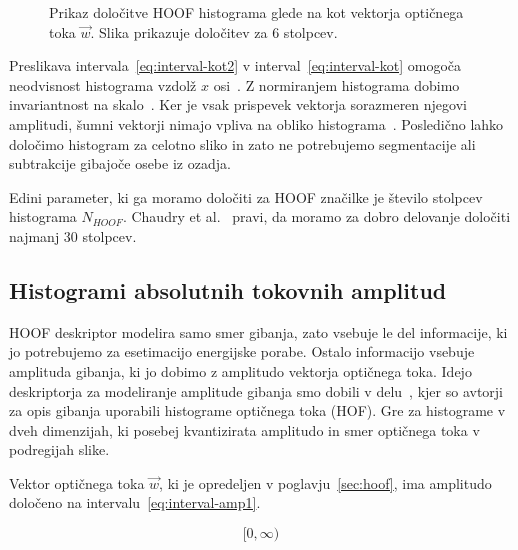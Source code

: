 \begin{figure}[htb]
\centering
\resizebox{0.5\columnwidth}{!}{}
\caption[Prikaz določitve HOOF histograma glede na kot vektorja]{Prikaz določitve HOOF histograma glede na kot vektorja optičnega toka $\vec{w}$. Slika prikazuje določitev za $6$ stolpcev.}
\label{fig:hoof-histogram}
\end{figure}




Preslikava intervala~\eqref{eq:interval-kot2} v interval~\eqref{eq:interval-kot} omogoča neodvisnost histograma vzdolž $x$ osi~\cite{chaudhry2009histograms}. Z normiranjem histograma dobimo invariantnost na skalo~\cite{chaudhry2009histograms}. Ker je vsak prispevek vektorja sorazmeren njegovi amplitudi, šumni vektorji nimajo vpliva na obliko histograma~\cite{chaudhry2009histograms}. Posledično lahko določimo histogram za celotno sliko in zato ne potrebujemo segmentacije ali subtrakcije gibajoče osebe iz ozadja. 

Edini parameter, ki ga moramo določiti za HOOF značilke je število stolpcev histograma $N_{HOOF}$. Chaudry et al.~\cite{chaudhry2009histograms} pravi, da moramo za dobro delovanje določiti najmanj $30$ stolpcev. 







\subsection{Histogrami absolutnih tokovnih amplitud}\label{sec:hafa}
HOOF deskriptor modelira samo smer gibanja, zato vsebuje le del informacije, ki jo potrebujemo za esetimacijo energijske porabe. Ostalo informacijo vsebuje amplituda gibanja, ki jo dobimo z amplitudo vektorja optičnega toka. Idejo deskriptorja za modeliranje amplitude gibanja smo dobili v delu~\cite{pers2010histograms}, kjer so avtorji za opis gibanja uporabili histograme optičnega toka (HOF). Gre za histograme v dveh dimenzijah, ki posebej kvantizirata amplitudo in smer optičnega toka v podregijah slike. 

Vektor optičnega toka $\vec{w}$, ki je opredeljen v poglavju~\ref{sec:hoof}, ima amplitudo določeno na intervalu~\eqref{eq:interval-amp1}. 

\begin{equation}\label{eq:interval-amp1}
	[0, \infty)
\end{equation}


